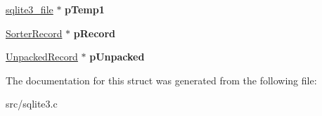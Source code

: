 \begin{DoxyCompactItemize}
\item 
\hypertarget{struct_vdbe_sorter_a8c419244559c715dcff6415b61d0e3ce}{\hyperlink{structsqlite3__file}{sqlite3\-\_\-file} $\ast$ {\bfseries p\-Temp1}}\label{struct_vdbe_sorter_a8c419244559c715dcff6415b61d0e3ce}

\item 
\hypertarget{struct_vdbe_sorter_aedb82586e8b8710b2ef95a950d937893}{\hyperlink{struct_sorter_record}{Sorter\-Record} $\ast$ {\bfseries p\-Record}}\label{struct_vdbe_sorter_aedb82586e8b8710b2ef95a950d937893}

\item 
\hypertarget{struct_vdbe_sorter_a0d85cdf1cf25c75cf90394d1bcfd27b9}{\hyperlink{struct_unpacked_record}{Unpacked\-Record} $\ast$ {\bfseries p\-Unpacked}}\label{struct_vdbe_sorter_a0d85cdf1cf25c75cf90394d1bcfd27b9}

\end{DoxyCompactItemize}


The documentation for this struct was generated from the following file\-:\begin{DoxyCompactItemize}
\item 
src/sqlite3.\-c\end{DoxyCompactItemize}
